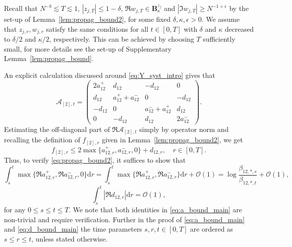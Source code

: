 \documentclass[10pt]{amsart}
\numberwithin{equation}{section}
\newcommand{\dif}{\mathrm{d}}
\begin{document}
Recall that $N^{-b}\lesssim T\lesssim 1$, $|z_{j,T}|\le 1-\delta$, $\Re w_{j,T}\in \mathbf{B}_\kappa^{z_j}$ and $|\Im w_{j,T}|\ge N^{-1+\epsilon}$ by the set-up of Lemma~\ref{lem:propag_bound2}, for some fixed $\delta,\kappa,\epsilon>0$. We assume that $z_{j,r}, w_{j,r}$ satisfy the same conditions for all $t\in [0,T]$ with $\delta$ and $\kappa$ decreased to $\delta/2$ and $\kappa/2$, respectively. This can be achieved by choosing $T$ sufficiently small, for more details see the set-up of Supplementary Lemma~\ref{lem:propag_bound}. 

An explicit calculation discussed around \eqref{eq:Y_syst_intro} gives that
\begin{equation}
\mathcal{A}_{[2],t}=
\begin{pmatrix}
2a_{12}^+&d_{12}&-d_{12}&0\\
d_{12}&a_{12}^++a_{12}^-&0&-d_{12}\\
-d_{12}&0&a_{12}^-+a_{12}^+&d_{12}\\
0&-d_{12}&d_{12}&2a_{12}^-
\end{pmatrix}.
\end{equation}
Estimating the off-diagonal part of $\Re\mathcal{A}_{[2],t}$ simply by operator norm and recalling the definition of $f_{[2],r}$ given in Lemma~\ref{lem:propag_bound2}, we get 
\begin{equation}
f_{[2],r}\le 2 \max\{a_{12,r}^+,a_{12,r}^-,0\} + d_{12,r},\quad r\in [0,T].
\label{eq:f2_bound}
\end{equation}
Thus, to verify \eqref{eq:propag_bound2}, it suffices to show that 
\begin{equation}
\int_s^t \max\{\Re a_{12,r}^+,\Re a_{12,r}^-,0\}\dif r=\int_s^t \max\{\Re a_{12,r}^+,\Re a_{12,r}^-\}\dif r + \mathcal{O}(1) = \log  \frac{\beta_{12,*,s}}{\beta_{12,*,t}} + \mathcal{O}(1),\label{eq:a_bound_main}
\end{equation}
\begin{equation}
\int_s^t |\Re d_{12,r}|\dif r=\mathcal{O}(1), \label{eq:d_bound_main}
\end{equation}
for any $0\le s\le t\le T$. We note that both identities in \eqref{eq:a_bound_main} are non-trivial and require verification. Further in the proof of \eqref{eq:a_bound_main} and \eqref{eq:d_bound_main} the time parameters $s,r,t\in [0,T]$ are ordered as $s\le r\le t$, unless stated otherwise.
\end{document}
